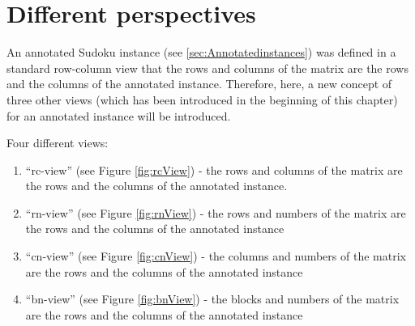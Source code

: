 \documentclass[11pt]{report}
\begin{document}
\section{Different  perspectives}
\label{sec:Differentperspectives}

An annotated Sudoku instance (see \ref{sec:Annotatedinstances}) was defined in a standard row-column view that the rows and columns of the matrix are the rows and the columns of the annotated instance. Therefore, here, a new concept of three other views (which has been introduced in the beginning of this chapter) for an annotated instance will be introduced.

Four different views:
\begin{enumerate}
\item ``rc-view'' (see Figure \ref{fig:rcView}) - the rows and columns of the matrix are the rows and the columns of the annotated instance.
\item ``rn-view'' (see Figure \ref{fig:rnView}) - the rows and numbers of the matrix are the rows and the columns of the annotated instance
\item ``cn-view'' (see Figure \ref{fig:cnView}) - the columns and numbers of the matrix are the rows and the columns of the annotated instance
\item ``bn-view'' (see Figure \ref{fig:bnView}) - the blocks and numbers of the matrix are the rows and the columns of the annotated instance
\end{enumerate}
\end{document}
